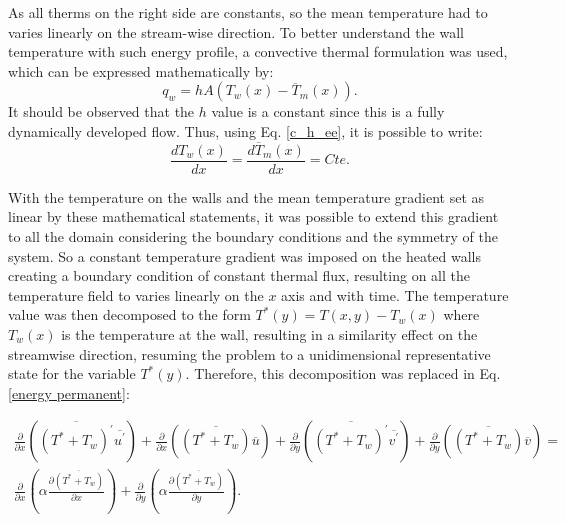 \documentclass[10pt]{article} %
\begin{document}
As all therms on the right side are constants, so the mean temperature had to varies linearly on the stream-wise direction.  
To better understand the wall temperature with such energy profile, a convective thermal formulation was used, which can be expressed mathematically by:
\begin{equation}
q_w = h A \left( T_w(x) - \overline{T}_m(x)\right).
\end{equation}
It should be observed that the $h$ value is a constant since this is a fully dynamically developed flow. Thus, using Eq. \ref{c_h_ee}, it is possible to write:
\begin{equation}
\frac{d T_w(x)}{d x} = \frac{d \overline{T}_m(x)}{d x} = Cte.
\end{equation}	

With the temperature on the walls and the mean temperature gradient set as linear by these mathematical statements, it was possible to extend this gradient to all the domain considering the boundary conditions and the symmetry of the system. So a constant temperature gradient was imposed on the heated walls creating a boundary condition of constant thermal flux, resulting on all the temperature field to varies linearly on the $x$ axis and with time. The temperature value was then decomposed to the form $ T^\ast(y) = T(x,y) - T_w(x) $ where $T_w(x)$ is the temperature at the wall, resulting in a similarity effect on the streamwise direction, resuming the problem to a unidimensional representative state for the variable $T^\ast(y)$. Therefore, this decomposition was replaced in Eq. \ref{energy permanent}:



\begin{equation}
\begin{split}
\frac{\partial{}}{\partial{x}} \left(\overline{(T^\ast + T_w)^\prime} \overline{ u^\prime}\right) + \frac{\partial{}}{\partial{x}}\left(\overline{(T^\ast + T_w)} \overline{u}\right)+ 
\frac{\partial{}}{\partial{y}} \left(\overline{(T^\ast + T_w)^\prime} \overline{ v^\prime}\right) + \frac{\partial{}}{\partial{y}}\left(\overline{(T^\ast + T_w)} \overline{v}\right) = \\
{\frac{\partial{}}{\partial{x}}} \left(\alpha {\frac{\partial{\overline{(T^\ast + T_w)}}}{\partial{x}}} \right) +
{\frac{\partial{}}{\partial{y}}} \left(\alpha {\frac{\partial{\overline{(T^\ast + T_w)}}}{\partial{y}}} \right). 
\end{split}
\end{equation}
\end{document}
